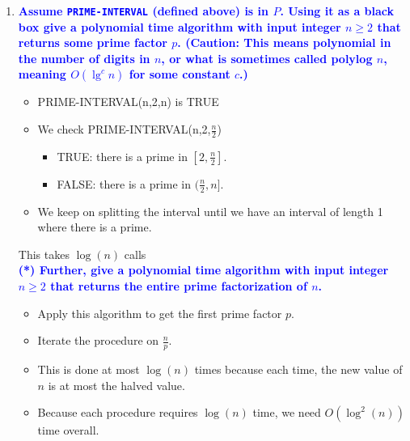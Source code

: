 \documentclass[11pt]{article}
\begin{document}
\begin{enumerate}
\item \textbf{\textcolor{blue}{Assume {\tt PRIME-INTERVAL} (defined above) is in $P$. Using it as a black box give a polynomial time algorithm with input integer $n\geq 2$ that returns some prime factor $p$.  (Caution: This means polynomial in the number of digits in $n$, or what is sometimes called polylog $n$, meaning $O(\lg^cn)$ for some constant $c$.)}}
    \begin{itemize}
        \item PRIME-INTERVAL(n,2,n) is TRUE
        \item We check PRIME-INTERVAL(n,2,$\frac{n}{2}$)
        \begin{itemize}
            \item TRUE: there is a prime in $[2, \frac{n}{2}]$.
            \item FALSE: there is a prime in $(\frac{n}{2}, n]$.
        \end{itemize}
        \item We keep on splitting the interval until we have an interval of length 1 where there is a prime.
    \end{itemize}
    This takes $\log(n)$ calls
\\ \textbf{\textcolor{blue}{(*) Further, give a polynomial time algorithm with input integer $n\geq 2$ that returns the entire prime factorization of $n$.}}
    \begin{itemize}
        \item Apply this algorithm to get the first prime factor $p$. 
        \item Iterate the procedure on $\frac{n}{p}$.
        \item This is done at most $\log(n)$ times because each time, the new value of $n$ is at most the halved value.
        \item Because each procedure requires $\log(n)$ time, we need $O(\log^2(n))$ time overall.
    \end{itemize}

\end{enumerate}
\end{document}
